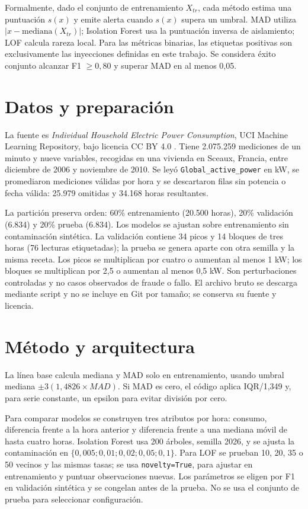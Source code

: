 \documentclass[10pt,twocolumn]{article}
\begin{document}
Formalmente, dado el conjunto de entrenamiento $X_{tr}$, cada método estima una puntuación $s(x)$ y emite alerta cuando $s(x)$ supera un umbral. MAD utiliza $|x-\mathrm{mediana}(X_{tr})|$; Isolation Forest usa la puntuación inversa de aislamiento; LOF calcula rareza local. Para las métricas binarias, las etiquetas positivas son exclusivamente las inyecciones definidas en este trabajo. Se considera éxito conjunto alcanzar F1 $\geq 0,80$ y superar MAD en al menos 0,05.

\section{Datos y preparación}
La fuente es \emph{Individual Household Electric Power Consumption}, UCI Machine Learning Repository, bajo licencia CC BY 4.0 \cite{uci}. Tiene 2.075.259 mediciones de un minuto y nueve variables, recogidas en una vivienda en Sceaux, Francia, entre diciembre de 2006 y noviembre de 2010. Se leyó \texttt{Global\_active\_power} en kW, se promediaron mediciones válidas por hora y se descartaron filas sin potencia o fecha válida: 25.979 omitidas y 34.168 horas resultantes.

La partición preserva orden: 60\% entrenamiento (20.500 horas), 20\% validación (6.834) y 20\% prueba (6.834). Los modelos se ajustan sobre entrenamiento sin contaminación sintética. La validación contiene 34 picos y 14 bloques de tres horas (76 lecturas etiquetadas); la prueba se genera aparte con otra semilla y la misma receta. Los picos se multiplican por cuatro o aumentan al menos 1 kW; los bloques se multiplican por 2,5 o aumentan al menos 0,5 kW. Son perturbaciones controladas y no casos observados de fraude o fallo. El archivo bruto se descarga mediante script y no se incluye en Git por tamaño; se conserva su fuente y licencia.

\section{Método y arquitectura}
La línea base calcula mediana y MAD solo en entrenamiento, usando umbral mediana $\pm 3(1,4826\times MAD)$. Si MAD es cero, el código aplica IQR/1,349 y, para serie constante, un epsilon para evitar división por cero.

Para comparar modelos se construyen tres atributos por hora: consumo, diferencia frente a la hora anterior y diferencia frente a una mediana móvil de hasta cuatro horas. Isolation Forest usa 200 árboles, semilla 2026, y se ajusta la contaminación en $\{0,005;0,01;0,02;0,05;0,1\}$. Para LOF se prueban 10, 20, 35 o 50 vecinos y las mismas tasas; se usa \texttt{novelty=True}, para ajustar en entrenamiento y puntuar observaciones nuevas. Los parámetros se eligen por F1 en validación sintética y se congelan antes de la prueba. No se usa el conjunto de prueba para seleccionar configuración.
\end{document}

